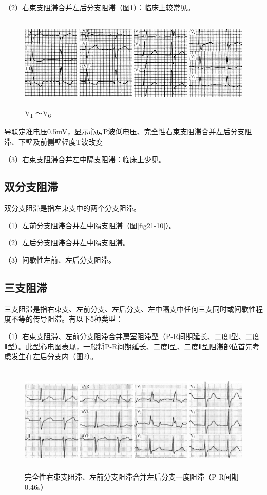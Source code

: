 （2）右束支阻滞合并左后分支阻滞（图\ref{fig21-14}）：临床上较常见。

\begin{figure}[!htbp]
 \centering
 \includegraphics[width=5.58333in,height=1.75in]{./images/Image00362.jpg}
 \captionsetup{justification=centering}
 \caption{V\textsubscript{1} ～V\textsubscript{6}}
 \label{fig21-14}
  \end{figure} 
导联定准电压0.5mV，显示心房P波低电压、完全性右束支阻滞合并左后分支阻滞、下壁及前侧壁轻度T波改变

（3）右束支阻滞合并左中隔支阻滞：临床上少见。

\protect\hypertarget{text00028.htmlux5cux23subid352}{}{}

\subsection{双分支阻滞}

双分支阻滞是指左束支中的两个分支阻滞。

（1）左前分支阻滞合并左中隔支阻滞（图\ref{fig21-10}）。

（2）左后分支阻滞合并左中隔支阻滞。

（3）间歇性左前、左后分支阻滞。

\protect\hypertarget{text00028.htmlux5cux23subid353}{}{}

\subsection{三支阻滞}

三支阻滞是指右束支、左前分支、左后分支、左中隔支中任何三支同时或间歇性程度不等的传导阻滞。有以下5种类型：

（1）右束支阻滞、左前分支阻滞合并房室阻滞型（P-R间期延长、二度Ⅰ型、二度Ⅱ型）。此型心电图表现，一般将P-R间期延长、二度Ⅰ型、二度Ⅱ型阻滞部位首先考虑发生在左后分支内（图\ref{fig21-15}）。

\begin{figure}[!htbp]
 \centering
 \includegraphics[width=5.78125in,height=2.05208in]{./images/Image00363.jpg}
 \captionsetup{justification=centering}
 \caption{完全性右束支阻滞、左前分支阻滞合并左后分支一度阻滞（P-R间期0.46s）}
 \label{fig21-15}
  \end{figure} 

